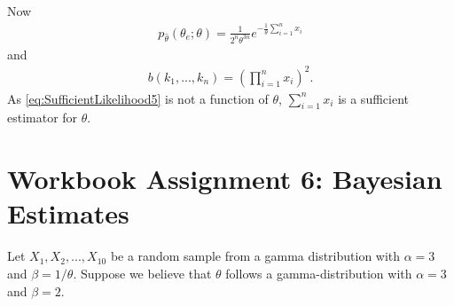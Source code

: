 Now
\begin{equation}
\begin{split}
p_{\hat{\theta}}(\theta_e;\theta) = \frac{1}{2^n\theta^{3n}} e^{-\frac{1}{\theta}\sum_{i=1}^nx_i}
\end{split}
\label{eq:SufficientLikelihood4}
\end{equation}
and
\begin{equation}
\begin{split}
b(k_1,...,k_n) = \left(\prod_{i=1}^n x_i\right)^2.
\end{split}
\label{eq:SufficientLikelihood5}
\end{equation}
As \eqref{eq:SufficientLikelihood5} is not a function of $\theta$, $\sum_{i=1}^nx_i$ is a sufficient estimator for $\theta$.






\chapter{Workbook Assignment 6: Bayesian Estimates}	
Let $X_1, X_2, ... , X_{10}$ be a random sample from a gamma distribution with $\alpha =3$ and $\beta =1/\theta$. Suppose we believe that $\theta$ follows a gamma-distribution with $\alpha =3$ and $\beta = 2$.

